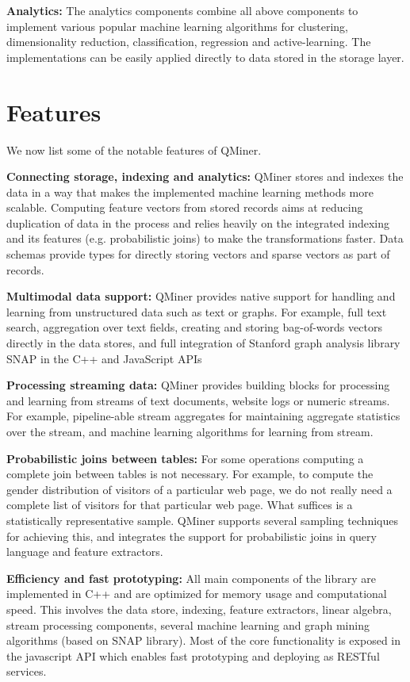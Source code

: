 \documentclass{article} %
\begin{document}
\textbf{Analytics:} The analytics components combine all above components to implement various popular machine learning algorithms for clustering, dimensionality reduction, classification, regression and active-learning. The implementations can be easily applied directly to data stored in the storage layer.


\section{Features}
We now list some of the notable features of QMiner.

\textbf{Connecting storage, indexing and analytics:} QMiner stores and indexes the data in a way that makes the implemented machine learning methods more scalable. Computing feature vectors from stored records aims at reducing duplication of data in the process and relies heavily on the integrated indexing and its features (e.g. probabilistic joins) to make the transformations faster. Data schemas provide types for directly storing vectors and sparse vectors as part of records.

\textbf{Multimodal data support:} QMiner provides native support for handling and learning from unstructured data such as text or graphs. For example, full text search, aggregation over text fields, creating and storing bag-of-words vectors directly in the data stores, and full integration of Stanford graph analysis library SNAP\cite{snap} in the C++ and JavaScript APIs

\textbf{Processing streaming data:} QMiner provides building blocks for processing and learning from streams of text documents, website logs or numeric streams. For example, pipeline-able stream aggregates for maintaining aggregate statistics over the stream, and machine learning algorithms for learning from stream.

\textbf{Probabilistic joins between tables:} For some operations computing a complete join between tables is not necessary. For example, to compute the gender distribution of visitors of a particular web page, we do not really need a complete list of visitors for that particular web page. What suffices is a statistically representative sample. QMiner supports several sampling techniques for achieving this, and integrates the support for probabilistic joins in query language and feature extractors.

\textbf{Efficiency and fast prototyping:} All main components of the library are implemented in C++ and are optimized for memory usage and computational speed. This involves the data store, indexing, feature extractors, linear algebra, stream processing components, several machine learning and graph mining algorithms (based on SNAP library). Most of the core functionality is exposed in the javascript API which enables fast prototyping and deploying as RESTful services.
\end{document}
